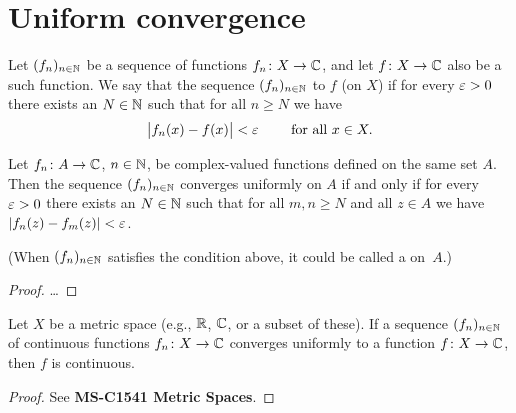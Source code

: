 \section{Uniform convergence}

\begin{definition}
  \label{def:uniform_limit}
  Let $(f_n)_{n \in \mathbb{N}}$ be a sequence of functions
  $f_n \colon X \to \mathbb{C}$, and let $f \colon X \to \mathbb{C}$
  also be a such function. We say that the sequence
  $(f_n)_{n \in \mathbb{N}}$  to $f$
  (on $X$) if for every $\varepsilon > 0$ there exists an $N \in \mathbb{N}$
  such that for all $n \ge N$ we have
  \begin{align*}
    \big| f_n(x) - f(x) \big| < \varepsilon
    \qquad \text{ for all } x \in X .
  \end{align*}
\end{definition}

\begin{lemma}
  \label{lem:cauchy_uniform_limit_criterion}
  Let $f_n \colon A \to \mathbb{C}$, $n \in \mathbb{N}$,
  be complex-valued functions defined on the same set $A$.
  Then the sequence $(f_n)_{n \in \mathbb{N}}$ converges uniformly on $A$
  if and only if for every $\varepsilon > 0$ there exists an $N \in \mathbb{N}$
  such that for all $m,n \ge N$ and all $z \in A$
  we have $|f_n(z) - f_m(z)| < \varepsilon$.

  (When $(f_n)_{n \in \mathbb{N}}$ satisfies the condition above, it could
  be called a  on~$A$.)
\end{lemma}
\begin{proof}
  \ldots
\end{proof}

\begin{lemma}
  \label{lem:uniform_limit_continuous}
  Let $X$ be a metric space (e.g., $\mathbb{R}$, $\mathbb{C}$, or a subset of these).
  If a sequence $(f_n)_{n \in \mathbb{N}}$ of continuous functions
  $f_n \colon X \to \mathbb{C}$ converges uniformly to a function
  $f \colon X \to \mathbb{C}$, then $f$ is continuous.
\end{lemma}
\begin{proof}
  See \textbf{MS-C1541 Metric Spaces}.
\end{proof}

